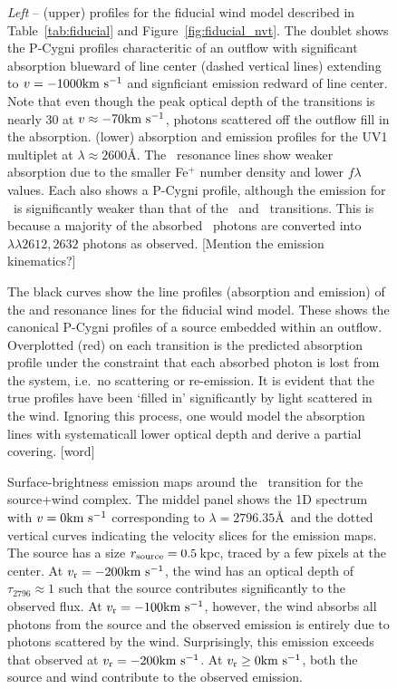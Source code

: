 \documentclass[12pt,preprint]{aastex}
\begin{document}
\begin{figure}
\caption{
{\it Left} -- (upper)  profiles for the fiducial wind model
described in Table~\ref{tab:fiducial} and
Figure~\ref{fig:fiducial_nvt}.  The doublet shows the P-Cygni profiles
characteritic of an outflow with significant absorption blueward of
line center (dashed vertical lines) extending to $v = -1000{\rm km~s^{-1}}$
and signficiant emission redward of line center.  Note
that even though the peak optical depth of the  transitions
is nearly 30 at $v \approx -70 {\rm km~s^{-1}}$, photons scattered off the outflow
fill in the absorption.
(lower)  absorption and emission profiles for the UV1
multiplet at $\lambda \approx 2600$\AA.  The \feiid\ resonance lines 
show weaker absorption due to the smaller Fe$^+$ number density and
lower $f\lambda$ values.  Each also shows a P-Cygni profile, although
the emission for \feiia\ is significantly weaker than that of the
\feiib\ and \mgiid\ transitions.  This is because a majority of the
absorbed \feiia\ photons are converted into
~$\lambda\lambda 2612, 2632$ photons as observed.
[Mention the emission kinematics?]
}
\label{fig:fiducial_1d}
\end{figure}

\begin{figure}
\caption{
The black curves show the line profiles (absorption and emission) of
the  and  resonance lines for the fiducial wind
model.  These shows the canonical P-Cygni profiles of a source
embedded within an outflow.  Overplotted (red) on each transition is
the predicted absorption profile under the constraint that each
absorbed photon is lost from the system, i.e.\ no scattering or
re-emission.   It is evident that the true profiles have been `filled
in' significantly by light scattered in the wind.  Ignoring this
process, one would model the absorption lines with systematicall lower
optical depth and derive a partial covering. [word]
}
\label{fig:noemiss}
\end{figure}

\begin{figure}
\caption{
Surface-brightness emission maps around the \mgiia\ transition for the
source+wind complex.  The middel panel shows the 1D spectrum with $v=0
{\rm km~s^{-1}}$ corresponding to $\lambda = 2796.35$\AA\ and the dotted vertical
curves indicating the velocity slices for the emission maps.  The
source has a size $r_{\rm source} = 0.5$\,kpc, traced by a few
pixels at the center.   At $v_{\rm r}=-200 {\rm km~s^{-1}}$, the wind has an optical
depth of $\tau_{2796} \approx 1$ such that the source contributes
significantly to the observed flux.  At $v_{\rm r}=-100 {\rm km~s^{-1}}$, however, the
wind absorbs all photons from the source and the observed emission is
entirely due to photons scattered by the wind.  Surprisingly, this
emission exceeds that observed at $v_{\rm r} = -200{\rm km~s^{-1}}$. At $v_{\rm r} \ge 0
{\rm km~s^{-1}}$,  both the source and wind contribute to the observed emission.
}
\label{fig:fiducial_ifu_mgii}
\end{figure}
\end{document}
